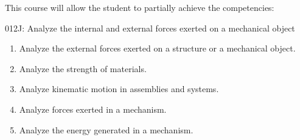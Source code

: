 {This course will allow the student to partially achieve the competencies:

012J: Analyze the internal and external forces exerted on a mechanical object
\begin{enumerate}
	\item Analyze the external forces exerted on a structure or a mechanical object.
	\item Analyze the strength of materials.
	\item Analyze kinematic motion in assemblies and systems.
	\item Analyze forces exerted in a mechanism.
	\item Analyze the energy generated in a mechanism.
\end{enumerate}
}
